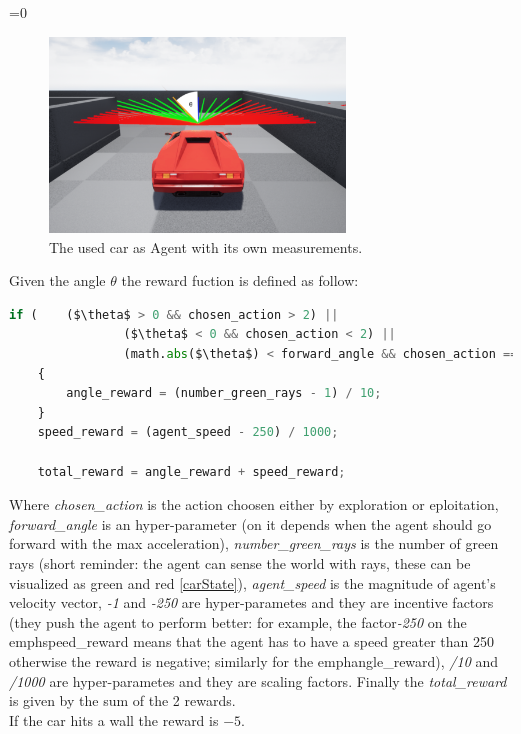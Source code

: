 \documentclass[14pt]{extarticle}
\newcounter{debug}
\begin{document}
\begin{flushleft}
\ifnum\value{debug}=0 {
\begin{figure}[H] \label{carAngle}
    		\centering\includegraphics[width=0.7\textwidth]{./Image/RF/carAngle.png}
		\vspace{5mm}
    		\caption{The used car as Agent with its own measurements.}
	\end{figure}
} \fi
	Given the angle $\theta$ the reward fuction is defined as follow:
\begin{lstlisting}[mathescape=true, language=Python]
	if (	($\theta$ > 0 && chosen_action > 2) ||
				($\theta$ < 0 && chosen_action < 2) ||
				(math.abs($\theta$) < forward_angle && chosen_action == 2))
	{
		angle_reward = (number_green_rays - 1) / 10;
	}
	speed_reward = (agent_speed - 250) / 1000;
	
	total_reward = angle_reward + speed_reward;
\end{lstlisting}
	Where \emph{chosen\_action} is the action choosen either by exploration or eploitation, \emph{forward\_angle} is an hyper-parameter (on it depends when the agent should go forward with the max acceleration), \emph{number\_green\_rays} is the number of green rays (short reminder: the agent can sense the world with rays, these can be visualized as green and red \ref{carState}), \emph{agent\_speed} is the magnitude of agent's velocity vector, \emph{-1} and \emph{-250} are hyper-parametes and they are incentive factors (they push the agent to perform better: for example, the factor\emph{-250} on the emph{speed\_reward} means that the agent has to have a speed greater than 250 otherwise the reward is negative; similarly for the emph{angle\_reward}), \emph{/10} and \emph{/1000} are hyper-parametes and they are scaling factors. Finally the \emph{total\_reward} is given by the sum of the 2 rewards.
	\\
	If the car hits a wall the reward is $-5$.
	

\end{flushleft}
\end{document}
